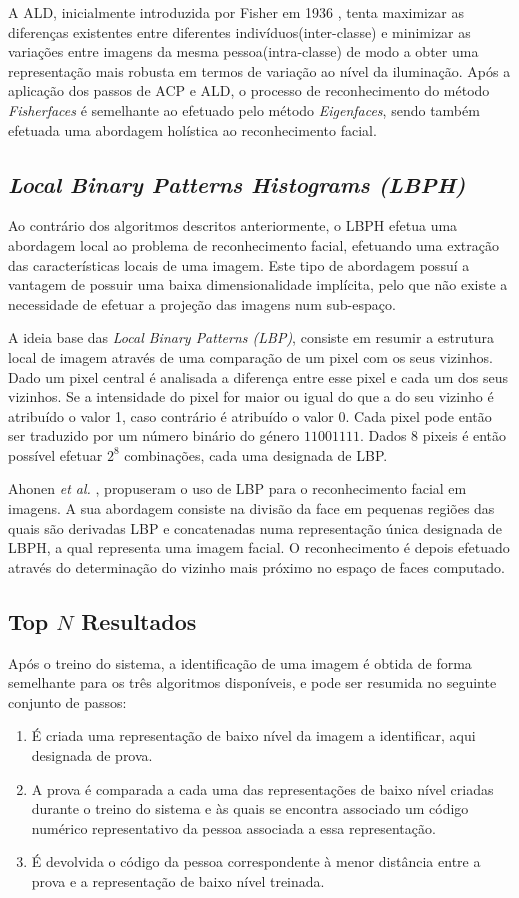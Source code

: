 A ALD, inicialmente introduzida por Fisher em 1936 \cite{FISHER1936}, tenta maximizar as diferenças existentes entre diferentes indivíduos(inter-classe) e minimizar as variações entre imagens da mesma pessoa(intra-classe) de modo a obter uma representação mais robusta em termos de variação ao nível da iluminação. Após a aplicação dos passos de ACP e ALD, o processo de reconhecimento do método \textit{Fisherfaces} é semelhante ao efetuado pelo método \textit{Eigenfaces}, sendo também efetuada uma abordagem holística ao reconhecimento facial.


\subsection{\textit{Local Binary Patterns Histograms (LBPH)}} \label{sec:lbph}
Ao contrário dos algoritmos descritos anteriormente, o LBPH efetua uma abordagem local ao problema de reconhecimento facial, efetuando uma extração das características locais de uma imagem. Este tipo de abordagem possuí a vantagem de possuir uma baixa dimensionalidade implícita, pelo que não existe a necessidade de efetuar a projeção das imagens num sub-espaço.

A ideia base das \textit{Local Binary Patterns (LBP)}, consiste em resumir a estrutura local de imagem através de uma comparação de um pixel com os seus vizinhos. Dado um pixel central é analisada a diferença entre esse pixel e cada um dos seus vizinhos. Se a intensidade do pixel for maior ou igual do que a do seu vizinho é atribuído o valor 1, caso contrário é atribuído o valor 0. Cada pixel pode então ser traduzido por um número binário do género $11001111$. Dados $8$ pixeis é então possível efetuar $2^8$ combinações, cada uma designada de LBP.

Ahonen \textit{et al.} \cite{ahonen2004face}, propuseram o uso de LBP para o reconhecimento facial em imagens. A sua abordagem consiste na divisão da face em pequenas regiões das quais são derivadas LBP e concatenadas numa representação única designada de LBPH, a qual representa uma imagem facial. O reconhecimento é depois efetuado através do determinação do vizinho mais próximo no espaço de faces computado.

\subsection{Top $N$ Resultados} \label{sec:topn}
Após o treino do sistema, a identificação de uma imagem é obtida de forma semelhante para os três algoritmos disponíveis, e pode ser resumida no seguinte conjunto de passos:
\begin{enumerate}
\item É criada uma representação de baixo nível da imagem a identificar, aqui designada de prova.
\item A prova é comparada a cada uma das representações de baixo nível criadas durante o treino do sistema e às quais se encontra associado um código numérico representativo da pessoa associada a essa representação.
\item É devolvida o código da pessoa correspondente à menor distância entre a prova e a representação de baixo nível treinada.
\end{enumerate}

